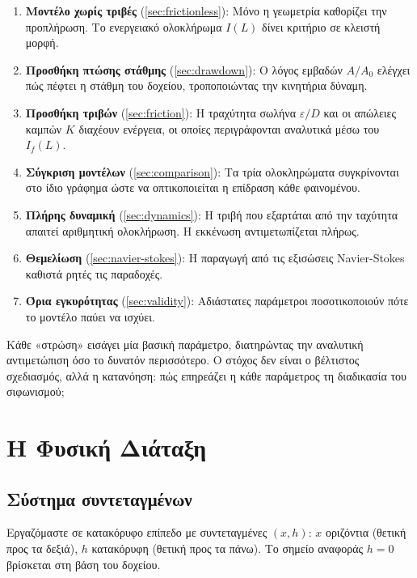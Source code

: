 \documentclass[11pt]{article}
\begin{document}
\begin{enumerate}[nosep,leftmargin=2em]
  \item \textbf{Μοντέλο χωρίς τριβές} (\cref{sec:frictionless}): Μόνο η γεωμετρία καθορίζει την προπλήρωση. Το ενεργειακό ολοκλήρωμα $I(L)$ δίνει κριτήριο σε κλειστή μορφή.
  \item \textbf{Προσθήκη πτώσης στάθμης} (\cref{sec:drawdown}): Ο λόγος εμβαδών $A/A_0$ ελέγχει πώς πέφτει η στάθμη του δοχείου, τροποποιώντας την κινητήρια δύναμη.
  \item \textbf{Προσθήκη τριβών} (\cref{sec:friction}): Η τραχύτητα σωλήνα $\varepsilon/D$ και οι απώλειες καμπών $K$ διαχέουν ενέργεια, οι οποίες περιγράφονται αναλυτικά μέσω του $I_f(L)$.
  \item \textbf{Σύγκριση μοντέλων} (\cref{sec:comparison}): Τα τρία ολοκληρώματα συγκρίνονται στο ίδιο γράφημα ώστε να οπτικοποιείται η επίδραση κάθε φαινομένου.
  \item \textbf{Πλήρης δυναμική} (\cref{sec:dynamics}): Η τριβή που εξαρτάται από την ταχύτητα απαιτεί αριθμητική ολοκλήρωση. Η εκκένωση αντιμετωπίζεται πλήρως.
  \item \textbf{Θεμελίωση} (\cref{sec:navier-stokes}): Η παραγωγή από τις εξισώσεις Navier-Stokes καθιστά ρητές τις παραδοχές.
  \item \textbf{Όρια εγκυρότητας} (\cref{sec:validity}): Αδιάστατες παράμετροι ποσοτικοποιούν πότε το μοντέλο παύει να ισχύει.
\end{enumerate}

Κάθε «στρώση» εισάγει μία βασική παράμετρο, διατηρώντας την αναλυτική αντιμετώπιση όσο το δυνατόν περισσότερο. Ο στόχος δεν είναι ο βέλτιστος σχεδιασμός, αλλά η κατανόηση: πώς επηρεάζει η κάθε παράμετρος τη διαδικασία του σιφωνισμού;

\section{Η Φυσική Διάταξη}
\label{sec:setup}

\subsection{Σύστημα συντεταγμένων}

Εργαζόμαστε σε κατακόρυφο επίπεδο με συντεταγμένες $(x, h)$: $x$ οριζόντια (θετική προς τα δεξιά), $h$ κατακόρυφη (θετική προς τα πάνω). Το σημείο αναφοράς $h = 0$ βρίσκεται στη βάση του δοχείου.
\end{document}
